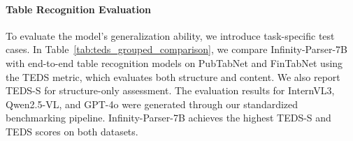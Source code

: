 \begin{table}[h]
  \begin{minipage}[t]{0.47\textwidth}
    \vspace{0pt} %
     \paragraph{Table Recognition Evaluation} To evaluate the model’s generalization ability, we introduce task-specific test cases. In Table~\ref{tab:teds_grouped_comparison}, we compare Infinity-Parser-7B with end-to-end table recognition models on PubTabNet and FinTabNet using the TEDS metric, which evaluates both structure and content. We also report TEDS-S for structure-only assessment. The evaluation results for InternVL3, Qwen2.5-VL, and GPT-4o were generated through our standardized benchmarking pipeline. Infinity-Parser-7B achieves the highest TEDS-S and TEDS scores on both datasets.
  \end{minipage}
  \hfill
  \begin{minipage}[t]{0.5\textwidth}
    \vspace{0pt} %
    \centering
    \small
    \renewcommand{\arraystretch}{1.1}
\end{minipage}
\end{table}
